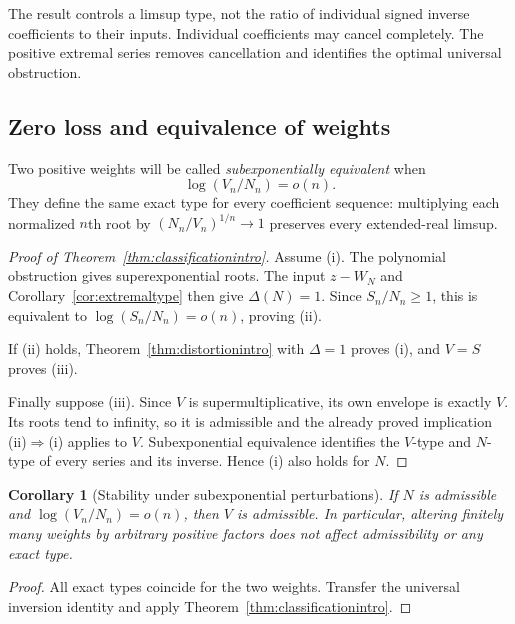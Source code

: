 \documentclass[11pt,a4paper]{article}
\numberwithin{equation}{section}
\newtheorem{corollary}[theorem]{Corollary}
\theoremstyle{definition}
\theoremstyle{remark}
\begin{document}
The result controls a limsup type, not the ratio of individual signed
inverse coefficients to their inputs. Individual coefficients may cancel
completely. The positive extremal series removes cancellation and
identifies the optimal universal obstruction.

\subsection{Zero loss and equivalence of weights}

Two positive weights will be called \emph{subexponentially equivalent}
when
\begin{equation}
 \log(V_n/N_n)=o(n).
 \label{eq:weightequivalence}
\end{equation}
They define the same exact type for every coefficient sequence: multiplying
each normalized $n$th root by $(N_n/V_n)^{1/n}\to1$ preserves every
extended-real limsup.

\begin{proof}[Proof of Theorem~\ref{thm:classificationintro}]
Assume (i). The polynomial obstruction gives superexponential roots.
The input $z-W_N$ and Corollary~\ref{cor:extremaltype} then give
$\Delta(N)=1$. Since $S_n/N_n\ge1$, this is equivalent to
$\log(S_n/N_n)=o(n)$, proving (ii).

If (ii) holds, Theorem~\ref{thm:distortionintro} with $\Delta=1$
proves (i), and $V=S$ proves (iii).

Finally suppose (iii). Since $V$ is supermultiplicative, its own envelope
is exactly $V$. Its roots tend to infinity, so it is admissible and the
already proved implication (ii)$\Rightarrow$(i) applies to $V$.
Subexponential equivalence identifies the $V$-type and $N$-type of every
series and its inverse. Hence (i) also holds for $N$.
\end{proof}

\begin{corollary}[Stability under subexponential perturbations]
\label{cor:perturbations}
If $N$ is admissible and $\log(V_n/N_n)=o(n)$, then $V$ is admissible.
In particular, altering finitely many weights by arbitrary positive
factors does not affect admissibility or any exact type.
\end{corollary}
\begin{proof}
All exact types coincide for the two weights. Transfer the universal
inversion identity and apply Theorem~\ref{thm:classificationintro}.
\end{proof}
\end{document}
